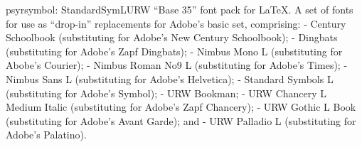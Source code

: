 \documentclass{ddltxtyp}
\begin{document}

\begin{package}{psyr}{symbol: StandardSymL}{URW ``Base 35'' font pack for {\LaTeX}.}
A set of fonts for use as ``drop-in'' replacements for Adobe's
basic set, comprising: - Century Schoolbook (substituting for
Adobe's New Century Schoolbook); - Dingbats (substituting for
Adobe's Zapf Dingbats); - Nimbus Mono L (substituting for
Abobe's Courier); - Nimbus Roman No9 L (substituting for
Adobe's Times); - Nimbus Sans L (substituting for Adobe's
Helvetica); - Standard Symbols L (substituting for Adobe's
Symbol); - URW Bookman; - URW Chancery L Medium Italic
(substituting for Adobe's Zapf Chancery); - URW Gothic L Book
(substituting for Adobe's Avant Garde); and - URW Palladio L
(substituting for Adobe's Palatino).
\end{package}
\end{document}
